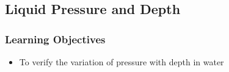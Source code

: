 

\subsection{Liquid Pressure and Depth}

\subsubsection*{Learning Objectives}
\begin{itemize}
\item{To verify the variation of pressure with depth in water} 
\end{itemize}

